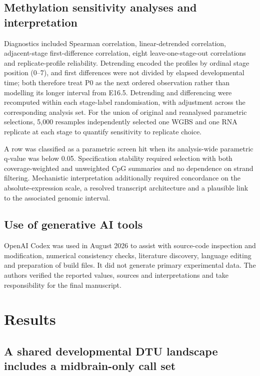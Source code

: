 \documentclass[11pt,a4paper]{article}
\begin{document}
\subsection{Methylation sensitivity analyses and interpretation}

Diagnostics included Spearman correlation, linear-detrended correlation, adjacent-stage first-difference correlation, eight leave-one-stage-out correlations and replicate-profile reliability. Detrending encoded the profiles by ordinal stage position (0--7), and first differences were not divided by elapsed developmental time; both therefore treat P0 as the next ordered observation rather than modelling its longer interval from E16.5. Detrending and differencing were recomputed within each stage-label randomisation, with adjustment across the corresponding analysis set. For the union of original and reanalysed parametric selections, 5,000 resamples independently selected one WGBS and one RNA replicate at each stage to quantify sensitivity to replicate choice.

A row was classified as a parametric screen hit when its analysis-wide parametric q-value was below 0.05. Specification stability required selection with both coverage-weighted and unweighted CpG summaries and no dependence on strand filtering. Mechanistic interpretation additionally required concordance on the absolute-expression scale, a resolved transcript architecture and a plausible link to the associated genomic interval.

\subsection{Use of generative AI tools}

OpenAI Codex was used in August 2026 to assist with source-code inspection and modification, numerical consistency checks, literature discovery, language editing and preparation of build files. It did not generate primary experimental data. The authors verified the reported values, sources and interpretations and take responsibility for the final manuscript.

\section{Results}

\subsection{A shared developmental DTU landscape includes a midbrain-only call set}
\end{document}
